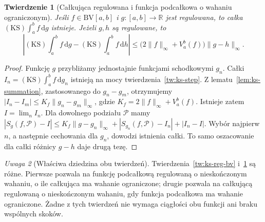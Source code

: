 \documentclass[11pt,a4paper]{article}
\numberwithin{equation}{section}
\theoremstyle{plain}
\newtheorem{twierdzenie}{Twierdzenie}[section]
\theoremstyle{definition}
\theoremstyle{remark}
\newtheorem{uwaga}[twierdzenie]{Uwaga}
\newcommand{\R}{\mathbb R}
\newcommand{\BV}{\mathrm{BV}}
\newcommand{\KS}{\mathrm{KS}}
\begin{document}
\begin{twierdzenie}[Całkująca regulowana i funkcja podcałkowa o wahaniu ograniczonym]
\label{tw:ks-bv-reg}
Jeśli $f\in\BV[a,b]$ i $g:[a,b]\to\R$ jest regulowana, to całka $(\KS)\int_a^b f\,\mathrm dg$ istnieje. Jeżeli $g,h$ są regulowane, to
\[
 \left|(\KS)\int_a^b f\,\mathrm dg-(\KS)\int_a^b f\,\mathrm dh\right|
 \le\bigl(2\|f\|_\infty+V_a^b(f)\bigr)\|g-h\|_\infty.
\]
\end{twierdzenie}
\begin{proof}
Funkcję $g$ przybliżamy jednostajnie funkcjami schodkowymi $g_n$. Całki $I_n=(\KS)\int_a^b f\,\mathrm dg_n$ istnieją na mocy twierdzenia~\ref{tw:ks-step}. Z lematu~\ref{lem:ks-summation}, zastosowanego do $g_n-g_m$, otrzymujemy $|I_n-I_m|\le K_f\|g_n-g_m\|_\infty$, gdzie $K_f=2\|f\|_\infty+V_a^b(f)$. Istnieje zatem $I=\lim_nI_n$. Dla dowolnego podziału $\mathcal P$ mamy
$|S_g(f,\mathcal P)-I|\le K_f\|g-g_n\|_\infty+|S_{g_n}(f,\mathcal P)-I_n|+|I_n-I|$. Wybór najpierw $n$, a następnie cechowania dla $g_n$, dowodzi istnienia całki. To samo oszacowanie dla całki różnicy $g-h$ daje drugą tezę.
\end{proof}

\begin{uwaga}[Właściwa dziedzina obu twierdzeń]
Twierdzenia~\ref{tw:ks-reg-bv} i~\ref{tw:ks-bv-reg} są różne. Pierwsze pozwala na funkcję podcałkową regulowaną o nieskończonym wahaniu, o ile całkująca ma wahanie ograniczone; drugie pozwala na całkującą regulowaną o nieskończonym wahaniu, gdy funkcja podcałkowa ma wahanie ograniczone. Żadne z tych twierdzeń nie wymaga ciągłości obu funkcji ani braku wspólnych skoków.
\end{uwaga}
\end{document}
